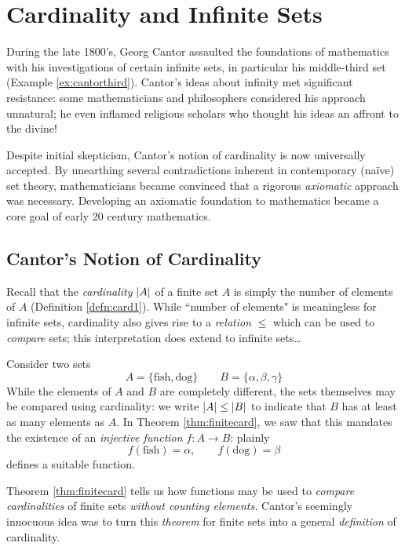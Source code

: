 \graphicspath{{8cardinality/asy/}}

\section{Cardinality and Infinite Sets}\label{chap:cantor}

During the late 1800's, Georg Cantor assaulted the foundations of mathematics with his investigations of certain infinite sets, in particular his middle-third set (Example \ref{ex:cantorthird}). Cantor's ideas about infinity met significant resistance: some mathematicians and philosophers considered his approach unnatural; he even inflamed religious scholars who thought his ideas an affront to the divine!\smallbreak

Despite initial skepticism, Cantor's notion of cardinality is now universally accepted. By unearthing several contradictions inherent in contemporary (naïve) set theory, mathematicians became convinced that a rigorous \emph{axiomatic} approach was necessary. Developing an axiomatic foundation to mathematics became a core goal of early 20\th{} century mathematics.


\subsection{Cantor's Notion of Cardinality}\label{sec:cantor}

Recall that the \emph{cardinality} $\left| A\right|$ of a finite set $A$ is simply the number of elements of $A$ (Definition \ref{defn:card1}). While ``number of elements" is meaningless for infinite sets, cardinality also gives rise to a \emph{relation} $\le$ which can be used to \emph{compare} sets; this interpretation does extend to infinite sets\ldots

\begin{example}{}{}
	Consider two sets
	\[
		A=\{\text{fish},\text{dog}\}\qquad B=\{\alpha,\beta,\gamma\}
	\]
	While the elements of $A$ and $B$ are completely different, the sets themselves may be compared using cardinality: we write $\left| A\right|\le \left| B\right|$ to indicate that $B$ has at least as many elements as $A$. In Theorem \ref{thm:finitecard}, we saw that this mandates the existence of an \emph{injective function} $f:A\to B$: plainly
	\[
		f(\text{fish})=\alpha,\qquad f(\text{dog})=\beta
	\]
	defines a suitable function.
\end{example}

Theorem \ref{thm:finitecard} tells us how functions may be used to \emph{compare cardinalities} of finite sets \emph{without counting elements.} Cantor's seemingly innocuous idea was to turn this \emph{theorem} for finite sets into a general \emph{definition} of cardinality.



